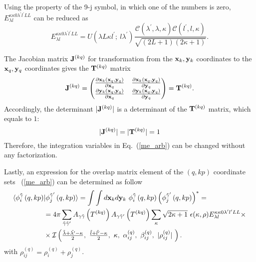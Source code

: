 \documentclass[
12pt, %
oneside, %
english, %
onehalfspacing, %
headsepline, %
]{MastersDoctoralThesis} %
\begin{document}
Using the property of the 9-j symbol, in which one of the numbers is zero, ${E}^{\kappa \kappa 0 \lambda^{\prime} l^{\prime} L L}_{\lambda l}$ can be reduced as
\begin{equation}
{E}^{\kappa \kappa 0 \lambda^{\prime} l^{\prime} L L}_{\lambda l}
=U\left(  \lambda L \kappa l^{\prime};~ l \lambda^{\prime} \right) \frac{\mathcal{C} \left( \lambda^{\prime}, \lambda, \kappa \right) \mathcal{C} \left( l^{\prime}, l, \kappa \right) }{ \sqrt{\left( 2L+1 \right) \left( 2\kappa +1 \right)}}.
\end{equation}

The Jacobian  matrix ${\bf J}^{(kq)}$ for transformation from the ${\bf x}_k, {\bf y}_k$ coordinates to the ${\bf x}_q, {\bf y}_q$ coordinates gives the ${\bf T}^{(kq)}$ matrix
\begin{equation}
{\bf J}^{(kq)} = 
\begin{pmatrix}
\frac{\partial {\bf x}_k \left({\bf x}_q,{\bf y}_q \right)}{ \partial {\bf x}_q }  
& \frac{\partial {\bf x}_k \left({\bf x}_q,{\bf y}_q \right)}{ \partial {\bf y}_q } \\
\frac{\partial {\bf y}_k \left({\bf x}_q,{\bf y}_q \right)}{ \partial {\bf x}_q }  
& \frac{\partial {\bf y}_k \left({\bf x}_q,{\bf y}_q \right)}{ \partial {\bf y}_q } 
\end{pmatrix} = {\bf T}^{(kq)}.
\end{equation}
Accordingly, the determinant $\vert {\bf J}^{(kq)} \vert$ is a determinant of the ${\bf T}^{(kq)}$ matrix, which equals to $1$:
\begin{equation}
\vert {\bf J}^{(kq)} \vert = \vert {\bf T}^{(kq)} \vert =1
\end{equation}
  Therefore, the integration variables in Eq.~(\ref{me_arb}) can be changed without any factorization. 
  
  Lastly, an expression for the overlap matrix element of the $(q,kp)$ coordinate sets ~(\ref{me_arb}) can be determined as follow
\begin{align}
\langle \phi_{i}^{\tilde{\gamma}}\left(q,kp \right) & \vert 
\phi_{j}^{\tilde{\gamma}^{\prime}}\left(q,kp \right) \rangle =
\int \int d{\bf x}_k d{\bf y}_k  ~\phi_{i}^{\tilde{\gamma}}\left(q,kp \right) \left( \phi_{j}^{\tilde{\gamma}^{\prime}}\left(q,kp \right) \right)^{*}  = \nonumber 
\\ & = 4 \pi \sum_{\tilde{\gamma}\tilde{\gamma}^{\prime}}  A_{\gamma\tilde{\gamma}}\left( T^{(kq)} \right) A_{\gamma\tilde{\gamma}^{\prime}}\left( T^{(kq)} \right)
 \sum_{\kappa} \sqrt{2\kappa+1}~ \epsilon(\kappa, \rho) {E}^{\kappa \kappa 0 \lambda^{\prime} l^{\prime} L L}_{\lambda l} \times  \nonumber \\
 &\times \mathcal{I}\left(
 \tfrac{\tilde{\lambda}+\tilde{\lambda^{\prime}}-\kappa}{2}, ~
 \tfrac{\tilde{l}+\tilde{l^{\prime}}-\kappa}{2},~
 \kappa,~
 \alpha^{(q)}_{ij},~
 \beta^{(q)}_{ij} ,~
 \vert \rho^{(q)}_{ij} \vert ~
  \right).
\end{align}
with $\rho_{ij}^{(q)}=\rho_{i}^{(q)}+\rho_{j}^{(q)}$.
\end{document}
